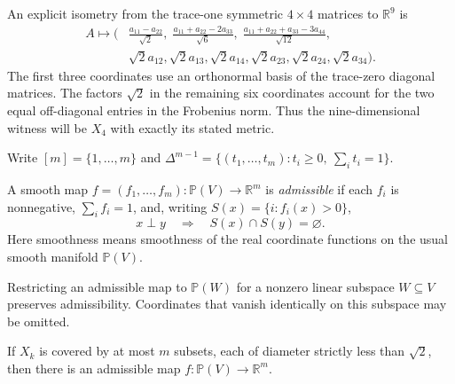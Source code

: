 \begin{remark}
An explicit isometry from the trace-one symmetric $4\times4$
matrices to $\mathbb R^9$ is
\begin{equation}
\begin{split}
 A\longmapsto\bigg(&\frac{a_{11}-a_{22}}{\sqrt2},\;
 \frac{a_{11}+a_{22}-2a_{33}}{\sqrt6},\;
 \frac{a_{11}+a_{22}+a_{33}-3a_{44}}{\sqrt{12}},\\
 &\sqrt2a_{12},\sqrt2a_{13},\sqrt2a_{14},
   \sqrt2a_{23},\sqrt2a_{24},\sqrt2a_{34}\bigg).
\end{split}
\label{eq:euclidean-coordinates}
\end{equation}
The first three coordinates use an orthonormal basis of the trace-zero
diagonal matrices.  The factors $\sqrt2$ in the remaining six coordinates
account for the two equal off-diagonal entries in the Frobenius norm.
Thus the nine-dimensional witness will be $X_4$ with exactly its stated
metric.
\end{remark}

Write $[m]=\{1,\ldots,m\}$ and
$\Delta^{m-1}=\{(t_1,\ldots,t_m):t_i\ge0,\ \sum_i t_i=1\}$.

\begin{definition}
\label{def:admissible}
A smooth map $f=(f_1,\ldots,f_m):\mathbb P(V)\to\mathbb R^m$ is
\emph{admissible} if each $f_i$ is nonnegative, $\sum_i f_i=1$, and,
writing $S(x)=\{i:f_i(x)>0\}$,
\begin{equation}
 x\perp y\quad\Longrightarrow\quad S(x)\cap S(y)=\varnothing.
 \label{eq:admissibility}
\end{equation}
Here smoothness means smoothness of the real coordinate functions on the
usual smooth manifold $\mathbb P(V)$.
\end{definition}

Restricting an admissible map to $\mathbb P(W)$ for a nonzero linear
subspace $W\subseteq V$ preserves admissibility.  Coordinates that vanish
identically on this subspace may be omitted.

\begin{lemma}
\label{lem:cover-to-map}
If $X_k$ is covered by at most $m$ subsets, each of diameter strictly less
than $\sqrt2$, then there is an admissible map
$f:\mathbb P(V)\to\mathbb R^m$.
\end{lemma}

